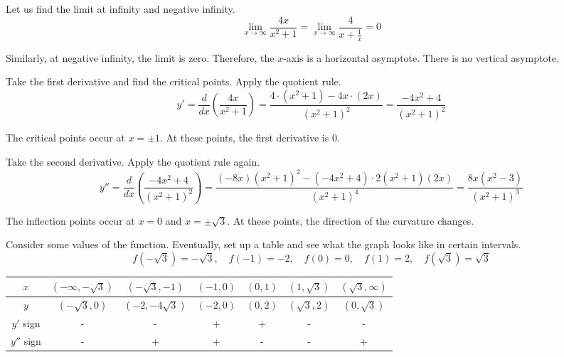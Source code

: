 \documentclass[a4paper, 12pt]{article}
\begin{document}
\begin{enumerate}[leftmargin=*,label=\textbf{\arabic*.}]
Let us find the limit at infinity and negative infinity.
\[\lim_{x\to\infty}\frac{4x}{x^2+1}=\lim_{x\to\infty}\frac{4}{x+\frac1x}=0\]

Similarly, at negative infinity, the limit is zero. Therefore, the $x$-axis is a horizontal asymptote. There is no vertical asymptote.

Take the first derivative and find the critical points. Apply the quotient rule.
\[y'=\frac d{dx}\left(\frac{4x}{x^2+1}\right)=\frac{4\cdot\left(x^2+1\right)-4x\cdot(2x)}{\left(x^2+1\right)^2}=\frac{-4x^2+4}{\left(x^2+1\right)^2}\]

The critical points occur at $x=\pm1$. At these points, the first derivative is $0$.

Take the second derivative. Apply the quotient rule again.
\[y''=\frac d{dx}\left(\frac{-4x^2+4}{\left(x^2+1\right)^2}\right)=\frac{\left(-8x\right)\left(x^2+1\right)^2-\left(-4x^2+4\right)\cdot2\left(x^2+1\right)(2x)}{\left(x^2+1\right)^4}=\frac{8x\left(x^2-3\right)}{\left(x^2+1\right)^3}\]

The inflection points occur at $x=0$ and $x=\pm\sqrt3$. At these points, the direction of the curvature changes.

Consider some values of the function. Eventually, set up a table and see what the graph looks like in certain intervals.
\[f\left(-\sqrt3\right)=-\sqrt3,\quad f(-1)=-2,\quad f(0)=0,\quad f(1)=2,\quad f\left(\sqrt3\right)=\sqrt3\]
\begin{center}
    \begin{tabular}{|c|cccccc|} 
    \hline
        $x$&$\left(-\infty,-\sqrt3\right)$&$\left(-\sqrt3,-1\right)$&$\left(-1,0\right)$&$\left(0,1\right)$&$\left(1,\sqrt3\right)$&$\left(\sqrt3,\infty\right)$\\
        \hline
        $y$&$\left(-\sqrt3,0\right)$&$\left(-2, -4\sqrt3\right)$&$(-2,0)$&$(0,2)$&$\left(\sqrt3,2\right)$&$\left(0,\sqrt3\right)$\\
        \hline
        $y'$ sign&-&-&+&+&-&-\\
        \hline
        $y''$ sign&-&+&+&-&-&+\\
        \hline
    \end{tabular}
\end{center}

\begin{center}
\end{center}
\end{enumerate}
\end{document}
